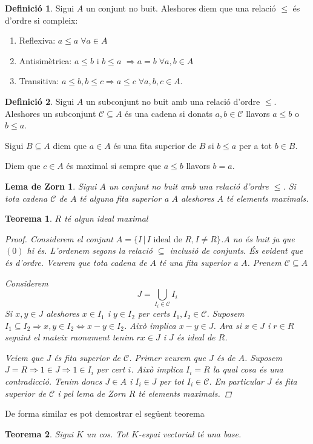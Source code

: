 \documentclass[a4paper,11pt]{report}
\newcommand{\barra}{\,|\,}
\renewcommand{\implies}{\Leftrightarrow}
\newcommand{\im}{\Rightarrow}
\theoremstyle{theorem}
\newtheorem{teorema}{\normalfont \sffamily\bfseries Teorema}[section]
\newtheorem*{zornlema}{\normalfont\sffamily\bfseries Lema de Zorn}
\theoremstyle{definition}
\newtheorem{definicio}{\normalfont\sffamily\bfseries Definició}[section]
\begin{document}
\begin{definicio}
	Sigui $A$ un conjunt no buit. Aleshores diem que una relació $\leq$ és d'ordre si compleix:
	\begin{enumerate}
		\item Reflexiva: $a\leq a\;\forall a\in A$
		\item Antisimètrica: $a\leq b$ i $b\leq a$ $\im a=b\;\forall a ,b \in A$
		\item Transitiva: $a\leq b,b\leq c\im a\leq c\;\forall a,b,c\in A$.
	\end{enumerate}
\end{definicio}\begin{definicio}Sigui $A$ un subconjunt no buit amb una relació d'ordre $\leq$. Aleshores
un subconjunt $\mathcal{C}\subseteq A$ és una cadena si donats $a,b\in \mathcal{C}$ llavors $a\leq b$ o $b\leq a$.

Sigui $B\subseteq A$ diem que $a\in A$ és una fita superior de $B$ si $b\leq a$ per a tot $b\in B$.

Diem que $c\in A$ és maximal si sempre que $a\leq b$ llavors $b=a$.
\end{definicio}
\begin{zornlema}
Sigui $A$ un conjunt no buit amb una relació d'ordre $\leq$. Si tota cadena $\mathcal{C}$ de $A$ té alguna fita superior a $A$ aleshores $A$ té elements maximals.
\end{zornlema}
\begin{teorema}
	$R$ té algun ideal maximal
	\begin{proof}
		Considerem el conjunt $A=\{I\barra I\text{ ideal de } R,I\neq R\}$.$A$ no és buit ja que $(0)$ hi és. L'ordenem segons la relació $\subseteq$ inclusió de conjunts. És evident que és d'ordre. Veurem que tota cadena de $A$ té una fita superior a $A$. Prenem $\mathcal{C}\subseteq A$
		
		Considerem $$J=\bigcup_{I_i\in\mathcal{C}}I_i$$
		Si $x,y\in J$ aleshores $x\in I_1$ i $y\in I_2$ per certs $I_1,I_2\in \mathcal{C}$. Suposem $I_1\subseteq I_2\im x,y\in I_2\implies x-y\in I_2$. Això implica $x-y\in J$. Ara si $x\in J$ i $r\in R$ seguint el mateix raonament tenim $rx\in J$ i $J$ és ideal de $R$. 
		
		Veiem que $J$ és fita superior de $\mathcal{C}$. Primer veurem que $J$ és de $A$. Suposem $J=R\im 1\in J\im 1\in I_i$ per cert $i$. Això implica $I_i=R$ la qual cosa és una contradicció. Tenim doncs $J\in A$ i $I_i\in J$ per tot $I_i\in\mathcal{C}$. En particular $J$ és fita superior de $\mathcal{C}$ i pel lema de Zorn $R$ té elements maximals.
	\end{proof}
\end{teorema}
De forma similar es pot demostrar el següent teorema
\begin{teorema}
	Sigui $K$ un cos. Tot $K$-espai vectorial té una base.
\end{teorema}
\end{document}
